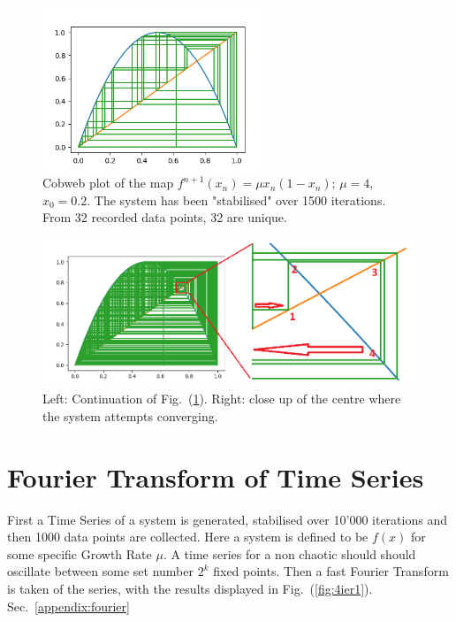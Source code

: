 \begin{figure}[h]
    \centering
    \includegraphics[width=0.6\textwidth]{Images/cobweb6.png}
    \caption{Cobweb plot of the map $f^{n+1}(x_n)=\mu x_n (1-x_n)$; $\mu = 4$, $x_0 = 0.2$. The system has been "stabilised" over 1500 iterations.
    From 32 recorded data points, 32 are unique.}
    \label{fig:cobweb3}
\end{figure}

\begin{figure}[h]
    \centering
    \includegraphics[width=1\textwidth]{Images/cobweb8.png}
    \caption{Left: Continuation of Fig.~(\ref{fig:cobweb3}). Right: close up of the centre where the system attempts converging.}
    \label{fig:cobweb4}
\end{figure}

\section{Fourier Transform of Time Series}

First a Time Series of a system is generated, stabilised over 10'000 iterations
and then 1000 data points are collected. Here a system is defined to be $f(x)$ for some specific Growth Rate $\mu$.
A time series for a non chaotic should should oscillate between some set number $2^k$ fixed points.
Then a fast Fourier Transform is taken of the series, with the results displayed in Fig.~(\ref{fig:4ier1}). Sec.~\ref{appendix:fourier}

